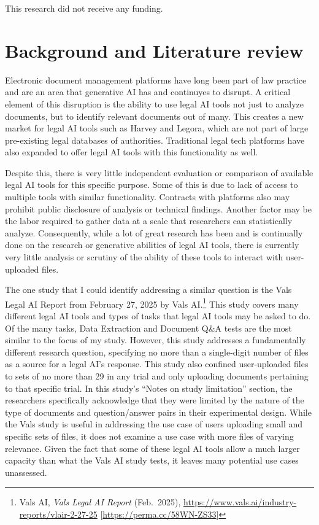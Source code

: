 \documentclass[
]{article}
\begin{document}
This research did not receive any funding.

\section{Background and Literature review}\label{background-and-literature-review}

Electronic document management platforms have long been part of law practice and are an area that generative AI has and continuyes to disrupt. A critical element of this disruption is the ability to use legal AI tools not just to analyze documents, but to identify relevant documents out of many. This creates a new market for legal AI tools such as Harvey and Legora, which are not part of large pre-existing legal databases of authorities. Traditional legal tech platforms have also expanded to offer legal AI tools with this functionality as well.

Despite this, there is very little independent evaluation or comparison of available legal AI tools for this specific purpose. Some of this is due to lack of access to multiple tools with similar functionality. Contracts with platforms also may prohibit public disclosure of analysis or technical findings. Another factor may be the labor required to gather data at a scale that researchers can statistically analyze. Consequently, while a lot of great research has been and is continually done on the research or generative abilities of legal AI tools, there is currently very little analysis or scrutiny of the ability of these tools to interact with user-uploaded files.

The one study that I could identify addressing a similar question is the Vals Legal AI Report from February 27, 2025 by Vals AI.\footnote{Vals AI, \emph{Vals Legal AI Report} (Feb.~2025), \url{https://www.vals.ai/industry-reports/vlair-2-27-25} {[}\url{https://perma.cc/58WN-ZS33}{]}} This study covers many different legal AI tools and types of tasks that legal AI tools may be asked to do. Of the many tasks, Data Extraction and Document Q\&A tests are the most similar to the focus of my study. However, this study addresses a fundamentally different research question, specifying no more than a single-digit number of files as a source for a legal AI's response. This study also confined user-uploaded files to sets of no more than 29 in any trial and only uploading documents pertaining to that specific trial. In this study's ``Notes on study limitation'' section, the researchers specifically acknowledge that they were limited by the nature of the type of documents and question/answer pairs in their experimental design. While the Vals study is useful in addressing the use case of users uploading small and specific sets of files, it does not examine a use case with more files of varying relevance. Given the fact that some of these legal AI tools allow a much larger capacity than what the Vals AI study tests, it leaves many potential use cases unassessed.
\end{document}
